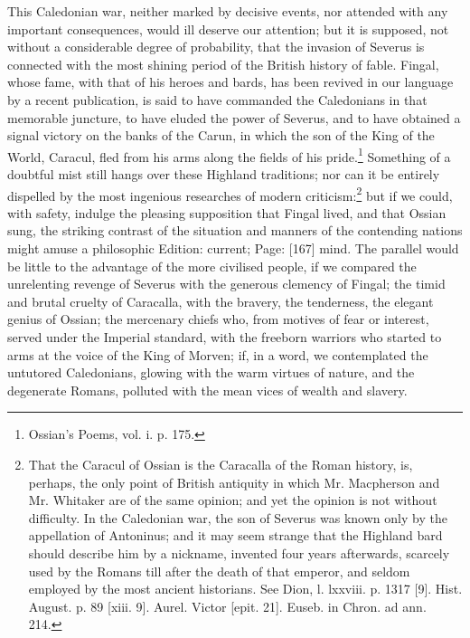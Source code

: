 This Caledonian war, neither marked by decisive events, nor attended with any important consequences, would ill deserve our attention; but it is supposed, not without a considerable degree of probability, that the invasion of Severus is connected with the most shining period of the British history of fable. Fingal, whose fame, with that of his heroes and bards, has been revived in our language by a recent publication, is said to have commanded the Caledonians in that memorable juncture, to have eluded the power of Severus, and to have obtained a signal victory on the banks of the Carun, in which the son of the King of the World, Caracul, fled from his arms along the fields of his pride.\footnote{Ossian\texthebrew{}’s Poems, vol. i. p. 175.} Something of a doubtful mist still hangs over these Highland traditions; nor can it be entirely dispelled by the most ingenious researches of modern criticism:\footnote{That the Caracul of Ossian is the Caracalla of the Roman history, is, perhaps, the only point of British antiquity in which Mr. Macpherson and Mr. Whitaker are of the same opinion; and yet the opinion is not without difficulty. In the Caledonian war, the son of Severus was known only by the appellation of Antoninus; and it may seem strange that the Highland bard should describe him by a nickname, invented four years afterwards, scarcely used by the Romans till after the death of that emperor, and seldom employed by the most ancient historians. See Dion, l. lxxviii. p. 1317 [9]. Hist. August. p. 89 [xiii. 9]. Aurel. Victor [epit. 21]. Euseb. in Chron. ad ann. 214.} but if we could, with safety, indulge the pleasing supposition that Fingal lived, and that Ossian sung, the striking contrast of the situation and manners of the contending nations might amuse a philosophic Edition: current; Page: [167] mind. The parallel would be little to the advantage of the more civilised people, if we compared the unrelenting revenge of Severus with the generous clemency of Fingal; the timid and brutal cruelty of Caracalla, with the bravery, the tenderness, the elegant genius of Ossian; the mercenary chiefs who, from motives of fear or interest, served under the Imperial standard, with the freeborn warriors who started to arms at the voice of the King of Morven; if, in a word, we contemplated the untutored Caledonians, glowing with the warm virtues of nature, and the degenerate Romans, polluted with the mean vices of wealth and slavery.

